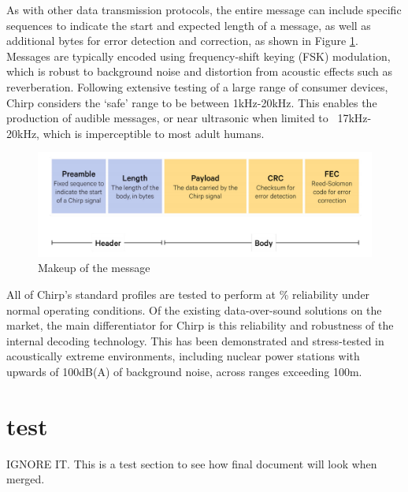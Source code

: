 \documentclass{article}
\begin{document}
As with other data transmission protocols, the entire message can include
specific sequences to indicate the start and expected length of a message, as
well as additional bytes for error detection and correction, as shown in Figure
\ref{fig:dos_message}. Messages are typically encoded using frequency-shift
keying (FSK) modulation, which is robust to background noise and distortion
from acoustic effects such as reverberation. Following extensive testing of a
large range of consumer devices, Chirp considers the ‘safe’ range to be between
1kHz-20kHz. This enables the production of audible messages, or near ultrasonic
when limited to ~17kHz-20kHz, which is imperceptible to most adult humans. 

\begin{figure}[!h]
  \includegraphics[width=\linewidth]{res/dos_message.png}
    \caption{Makeup of the message}
  \label{fig:dos_message}
\end{figure}

All of Chirp’s standard profiles are tested to perform at \% reliability
under normal operating conditions. Of the existing data-over-sound solutions
on the market, the main differentiator for Chirp is this reliability and
robustness of the internal decoding technology. This has been demonstrated and
stress-tested in acoustically extreme environments, including nuclear power
stations with upwards of 100dB(A) of background noise, across ranges exceeding
100m.

\nocite{chirp17}
\printbibliography[heading=subbibliography]


\vspace{2in}
\section{test}
IGNORE IT. This is a test section to see how final document will look when merged. \\

\lipsum[1-1]
\printbibliography[heading=subbibliography]
\end{document}
